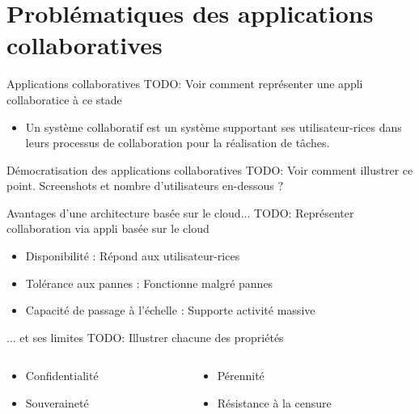 \section{Problématiques des applications collaboratives}

\begin{frame}{Applications collaboratives}
    TODO: Voir comment représenter une appli collaboratice à ce stade
    \begin{itemize}
        \item Un \alert{système collaboratif} est un système supportant ses utilisateur-rices dans leurs processus de collaboration pour la réalisation de tâches.
    \end{itemize}
\end{frame}

\begin{frame}{Démocratisation des applications collaboratives}
    TODO: Voir comment illustrer ce point.
    Screenshots et nombre d'utilisateurs en-dessous ?
\end{frame}

\begin{frame}{Avantages d'une architecture basée sur le cloud...}
    TODO: Représenter collaboration via appli basée sur le cloud
    \begin{itemize}
        \item \alert{Disponibilité} : Répond aux utilisateur-rices
        \item \alert{Tolérance aux pannes} : Fonctionne malgré pannes
        \item \alert{Capacité de passage à l'échelle} : Supporte activité massive
    \end{itemize}
\end{frame}

\begin{frame}{... et ses limites}
    TODO: Illustrer chacune des propriétés
    \begin{columns}
        \begin{column}{0.5\textwidth}
            \begin{itemize}
                \item Confidentialité
                \item Souveraineté
            \end{itemize}
        \end{column}
        \begin{column}{0.5\textwidth}
            \begin{itemize}
                \item Pérennité
                \item Résistance à la censure
            \end{itemize}
        \end{column}
    \end{columns}
\end{frame}

